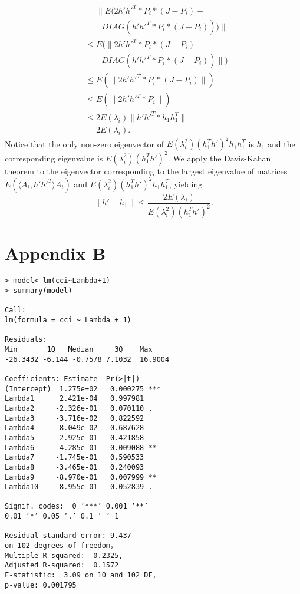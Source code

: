 \documentclass[10pt,journal,compsoc]{IEEEtran}
\newenvironment{proof}[1][Proof]{\begin{trivlist}
		\item[\hskip \labelsep {\bfseries #1}]}{\end{trivlist}}
\begin{document}
\begin{proof} [Proof of Theorem 4.2]
\begin{align*}
	&= \|E(2 h' h'^T *P_i*(J-P_i) - \\
	&\qquad DIAG(h' h'^T*P_i*(J-P_i)))\| \\
	&\leq  E(\|2 h' h'^T *P_i*(J-P_i) - \\
	&\qquad DIAG(h' h'^T*P_i*(J-P_i))\|) \\
	&\leq  E(\|2 h' h'^T *P_i*(J-P_i)\|) \\
	&\leq  E(\|2 h' h'^T * P_i\|) \\
	&\leq  2 E(\lambda_i)\| h' h'^T * h_1 h_1^T\| \\
	&=  2 E(\lambda_i) .
	\end{align*}
	Notice that the only non-zero eigenvector of $E(\lambda_i^2) (h_1^Th')^2 h_1 h_1^T$ is $h_1$ and the corresponding eigenvalue is $E(\lambda_i^2) (h_1^Th')^2$. We apply the Davis-Kahan theorem \cite{davis1970rotation} to the eigenvector corresponding to the largest eigenvalue of matrices $E(\langle A_{i},h' h'^T \rangle A_{i} )$ and $E(\lambda_i^2) (h_1^Th')^2 h_1 h_1^T$, yielding
	\[\|h'-h_1\| \leq \frac{2 E(\lambda_i)}{E(\lambda_i^2)(h_1^T h')^2}. \]
\end{proof}

\section*{Appendix B}
\begin{lstlisting}
> model<-lm(cci~Lambda+1)
> summary(model)

Call:
lm(formula = cci ~ Lambda + 1)

Residuals:
Min       1Q   Median     3Q    Max 
-26.3432 -6.144 -0.7578 7.1032  16.9004 

Coefficients: Estimate  Pr(>|t|)    
(Intercept)  1.275e+02   0.000275 ***
Lambda1      2.421e-04   0.997981    
Lambda2     -2.326e-01   0.070110 .  
Lambda3     -3.716e-02   0.822592    
Lambda4      8.049e-02   0.687628    
Lambda5     -2.925e-01   0.421858    
Lambda6     -4.285e-01   0.009088 ** 
Lambda7     -1.745e-01   0.590533    
Lambda8     -3.465e-01   0.240093    
Lambda9     -8.970e-01   0.007999 ** 
Lambda10    -8.955e-01   0.052839 .  
---
Signif. codes:  0 ‘***’ 0.001 ‘**’ 
0.01 ‘*’ 0.05 ‘.’ 0.1 ‘ ’ 1

Residual standard error: 9.437 
on 102 degrees of freedom，
Multiple R-squared:  0.2325,
Adjusted R-squared:  0.1572 
F-statistic:  3.09 on 10 and 102 DF,  
p-value: 0.001795
\end{lstlisting}
\end{document}
